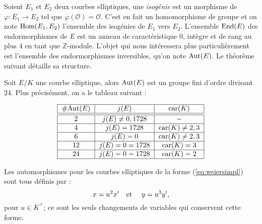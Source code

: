 \documentclass[a4paper]{article} %
\numberwithin{section}{part}
\numberwithin{equation}{section}
\newcommand\ZZ{\mathbb{Z}}
\newcommand\EO{\mathcal{O}}
\newcommand\etmath{\textup{\quad et \quad}}
\begin{document}
Soient $E_1$ et $E_2$ deux courbes elliptiques, une \emph{isogénie} est un
morphisme \cite[p.12]{Sil} de $\varphi : E_1 \rightarrow E_2$ tel que 
$\varphi(\EO) = \EO$. C'est en fait un homomorphisme de groupe et on note 
$\textup{Hom}(E_1, E_2)$ l'ensemble des isogénies de $E_1$ vers $E_2$. 
L'ensemble $\textup{End}(E)$ des endormorphismes de $E$ est un anneau de 
caractéristique $0$, intègre et de rang au plus $4$ en tant que $\ZZ$-module. 
L'objet qui nous intéressera plus particulièrement est l'ensemble des 
endormorphismes inversibles, qu'on note $\textup{Aut}(E)$. Le théorème suivant 
détaille sa structure.
\begin{thm}
\label{th:autell}
Soit $E/K$ une courbe elliptique, alors $\textup{Aut}(E)$ est un groupe fini
d'ordre divisant $24$. Plus précisément, on a le tableau suivant :

\begin{equation}
\begin{tabular}{|c|c|c|}
    \hline
    \#Aut$(E)$ & $j(E)$ & car$(K)$\\
    \hline\hline
    $2$ & $j(E)\neq0,1728$ & $-$\\
    \hline
    $4$ & $j(E) = 1728$ & car$(K)\neq 2, 3$\\
    \hline
    $6$ & $j(E) = 0$ & car$(K)\neq 2, 3$\\
    \hline
    $12$ & $j(E) = 0 = 1728$ & car$(K) = 3$\\
    \hline
    $24$ & $j(E) = 0 = 1728$ & car$(K) = 2$\\
    \hline
\end{tabular}
\end{equation}
\end{thm}
Les automorphismes pour les courbes elliptiques de la forme
(\ref{eq:weiersimpl}) sont tous définis par : 
\begin{equation}
x = u^2x'\etmath y = u^3y',
\end{equation}
pour $u\in\overline{K}^{\times}$; ce sont les seuls changements de variables qui
conservent cette forme.
\end{document}
